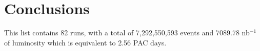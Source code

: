 \documentclass[11pt]{article}
\begin{document}
\section{Conclusions}
This list contains 82 runs, with a total of 7,292,550,593 events and 7089.78 nb$^{-1}$ of luminosity which is equivalent to 2.56 PAC days.  
\end{document}
